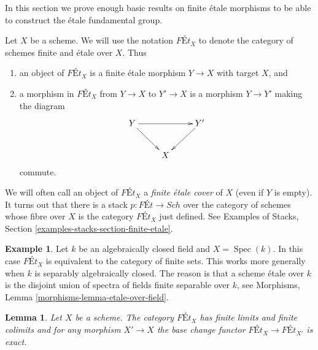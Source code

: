 \documentclass{stacks-project}
\theoremstyle{plain}
\newtheorem{lemma}[subsection]{Lemma}
\theoremstyle{definition}
\newtheorem{example}[subsection]{Example}
\theoremstyle{remark}
\numberwithin{equation}{subsection}
\def\Spec{\mathop{\mathrm{Spec}}}
\def\Sch{\mathit{Sch}}
\begin{document}
\noindent
In this section we prove enough basic results on finite \'etale
morphisms to be able to construct the \'etale fundamental group.

\medskip\noindent
Let $X$ be a scheme. We will use the notation $\textit{F\'Et}_X$
to denote the category of schemes finite and \'etale over $X$.
Thus
\begin{enumerate}
\item an object of $\textit{F\'Et}_X$ is a finite \'etale morphism
$Y \to X$ with target $X$, and
\item a morphism in $\textit{F\'Et}_X$
from $Y \to X$ to $Y' \to X$ is a morphism $Y \to Y'$ making
the diagram
$$
\xymatrix{
Y \ar[rr] \ar[rd] & &  Y' \ar[ld] \\
& X
}
$$
commute.
\end{enumerate}
We will often call an object of $\textit{F\'Et}_X$ a
{\it finite \'etale cover} of $X$ (even if $Y$ is empty).
It turns out that there is a stack $p : \textit{F\'Et} \to \Sch$
over the category of schemes whose fibre over $X$ is the category
$\textit{F\'Et}_X$ just defined. See Examples of Stacks, Section
\ref{examples-stacks-section-finite-etale}.

\begin{example}
\label{example-finite-etale-geometric-point}
Let $k$ be an algebraically closed field and $X = \Spec(k)$. In this case
$\textit{F\'Et}_X$ is equivalent to the category of finite sets. This works
more generally when $k$ is separably algebraically closed. The reason is
that a scheme \'etale over $k$ is the disjoint union of spectra of
fields finite separable over $k$, see
Morphisms, Lemma \ref{morphisms-lemma-etale-over-field}.
\end{example}

\begin{lemma}
\label{lemma-finite-etale-covers-limits-colimits}
Let $X$ be a scheme. The category $\textit{F\'Et}_X$ has finite limits and
finite colimits and for any morphism $X' \to X$ the base change functor
$\textit{F\'Et}_X \to \textit{F\'Et}_{X'}$ is exact.
\end{lemma}
\end{document}
